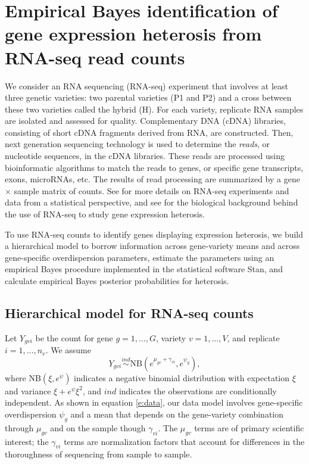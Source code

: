 \documentclass[useAMS,usenatbib,referee]{biom}
\newcommand{\Stan}{Stan}
\newcommand{\RNAseq}{RNA-seq}
\begin{document}
\section{Empirical Bayes identification of gene expression heterosis from \RNAseq{} read counts}
\label{s:method}

We consider an RNA sequencing (\RNAseq{}) experiment that involves at least three genetic varieties: two parental varieties (P1 and P2) and a cross between these two varieties called the hybrid (H). For each variety, replicate RNA samples are isolated and assessed for quality. Complementary DNA (cDNA) libraries, consisting of short cDNA fragments derived from RNA, are constructed. Then, next generation sequencing technology is used to determine the \emph{reads}, or nucleotide sequences, in the cDNA libraries. These reads are processed using bioinformatic algorithms to match the reads to genes, or specific gene transcripts, exons, microRNAs, etc. The results of read processing are summarized by a gene $\times$ sample matrix of counts. See \cite{datta2014statistical} for more details on \RNAseq{} experiments and data from a statistical perspective, and see \cite{paschold2012complementation} for the biological background behind the use of \RNAseq{} to study gene expression heterosis.

To use \RNAseq{} counts to identify genes displaying expression heterosis, we build a hierarchical model to borrow information across gene-variety means and across gene-specific overdispersion parameters, estimate the parameters using an empirical Bayes procedure implemented in the statistical software \Stan{}, and calculate empirical Bayes posterior probabilities for heterosis. 


\subsection{Hierarchical model for \RNAseq{} counts}
\label{s:model}

Let $Y_{gvi}$ be the count for gene $g=1,\ldots,G$, variety $v=1,\ldots,V$, and replicate $i=1,\ldots,n_v$.  We assume
\begin{equation} 
Y_{gvi} \stackrel{ind}{\sim} \mbox{NB}\left(e^{\mu_{gv}+\gamma_{vi}},e^{\psi_g}\right), 
\label{e:data}
\end{equation}
where NB$(\xi,e^\psi)$ indicates a negative binomial distribution with expectation $\xi$ and variance $\xi+e^\psi\xi^2$, and $ind$ indicates the observations are conditionally independent.  As shown in equation \eqref{e:data}, our data model involves gene-specific overdispersion $\psi_g$ and a mean that depends on the gene-variety combination through $\mu_{gv}$ and on the sample though  $\gamma_{vi}$.  The $\mu_{gv}$ terms are of primary scientific interest; the $\gamma_{vi}$ terms are normalization factors that account for differences in the thoroughness of sequencing from sample to sample. 
\end{document}
